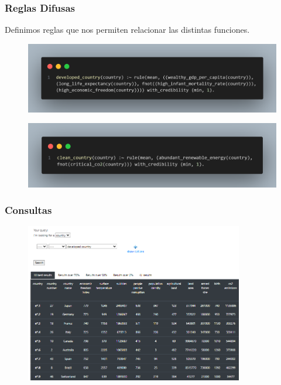 \documentclass{beamer}
\newcommand{\slideauthor}[1]{\gdef\insertslideauthor{#1}}
\newcommand{\insertslideauthor}{}
\begin{document}
\begin{frame}
\frametitle{Reglas Difusas}
\slideauthor{Javier Comyn}
Definimos reglas que nos permiten relacionar las distintas funciones.
\begin{figure}
    \centering
    \includegraphics[width=\linewidth]{Images/developed_country.png}
\end{figure}
\begin{figure}
    \centering
    \includegraphics[width=\linewidth]{Images/clean_country.png}
\end{figure}
\end{frame}

\begin{frame}
\frametitle{Consultas}
\slideauthor{Javier Comyn}
\begin{figure}
\includegraphics[width=0.85\textwidth]{Images/developed_country (1).png} 
\end{figure}
\end{frame}
\end{document}
